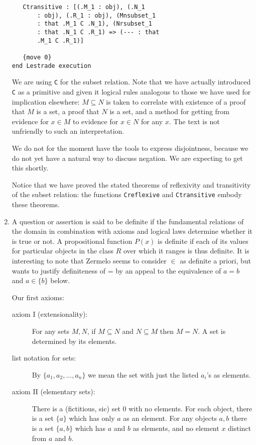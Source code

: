 \documentclass[12pt]{article}
\begin{document}
\begin{enumerate}
\begin{verbatim}
   Ctransitive : [(.M_1 : obj), (.N_1 
       : obj), (.R_1 : obj), (Mnsubset_1 
       : that .M_1 C .N_1), (Nrsubset_1 
       : that .N_1 C .R_1) => (--- : that 
       .M_1 C .R_1)]

   {move 0}
end Lestrade execution

\end{verbatim}

We are using {\tt C} for the subset relation.  Note that we have actually introduced {\tt C} as a primitive and given it
logical rules analogous to those we have used for implication elsewhere:  $M \subseteq N$ is taken to correlate with existence of
a proof that $M$ is a set, a proof that $N$ is a set, and a method for getting from evidence for $x \in M$ to evidence for $x \in N$ for any $x$.  The text
is not unfriendly to such an interpretation.

We do not for the moment have the tools to express disjointness, because we do not yet have a natural way
to discuss negation.  We are expecting to get this shortly.

Notice that we have proved the stated theorems of reflexivity and transitivity of the subset relation:  the functions {\tt Creflexive} and {\tt Ctransitive} embody these theorems.

\item  A question or assertion is said to be definite if the fundamental relations of the domain in combination with axioms and logical laws determine whether it is true or not.  A propositional function $P(x)$ is definite if each of its values for particular objects in the class $R$ over which it ranges is thus definite.  It is interesting to note that Zermelo seems to consider $\in$ as definite a priori, but wants to justify definiteness of = by an appeal to the equivalence of $a=b$ and $a \in \{b\}$ below.

Our first axioms:

\begin{description}

\item[axiom I (extensionality):]   For any sets $M,N$, if $M \subseteq N$ and $N \subseteq M$ then $M=N$.  A set is determined by its elements.

\item[list notation for sets:]  By $\{a_1,a_2,\ldots,a_n\}$ we mean the set with just the listed $a_i$'s as elements.

\item[axiom II (elementary sets):]   There is a (fictitious, sic) set 0 with no elements.  For each object, there is a set $\{a\}$ which has only $a$ as an element.  For any objects $a,b$ there is a set $\{a,b\}$ which has $a$ and $b$ as elements, and no element $x$ distinct from $a$ and $b$.


\end{description}
\end{enumerate}
\end{document}
